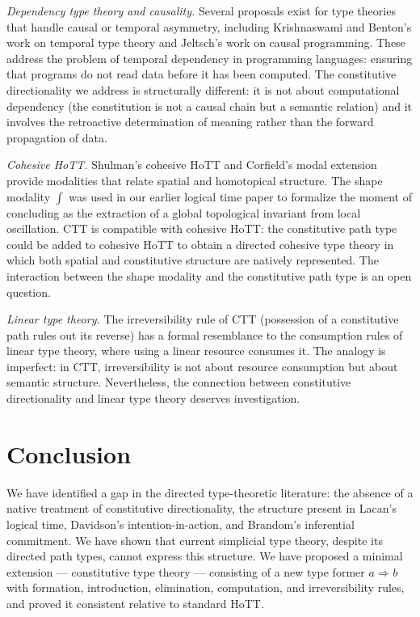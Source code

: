 \documentclass[12pt]{article}
\theoremstyle{definition}
\theoremstyle{remark}
\newcommand{\consthom}[3]{#2 \Rightarrow_{#1} #3}
\begin{document}
\textit{Dependency type theory and causality.} Several proposals exist for type theories that handle causal or temporal asymmetry, including Krishnaswami and Benton's work on temporal type theory and Jeltsch's work on causal programming. These address the problem of temporal dependency in programming languages: ensuring that programs do not read data before it has been computed. The constitutive directionality we address is structurally different: it is not about computational dependency (the constitution is not a causal chain but a semantic relation) and it involves the retroactive determination of meaning rather than the forward propagation of data.

\textit{Cohesive HoTT.} Shulman's cohesive HoTT \cite{shulman2018} and Corfield's modal extension \cite{corfield2020} provide modalities that relate spatial and homotopical structure. The shape modality $\int$ was used in our earlier logical time paper to formalize the moment of concluding as the extraction of a global topological invariant from local oscillation. CTT is compatible with cohesive HoTT: the constitutive path type could be added to cohesive HoTT to obtain a directed cohesive type theory in which both spatial and constitutive structure are natively represented. The interaction between the shape modality and the constitutive path type is an open question.

\textit{Linear type theory.} The irreversibility rule of CTT (possession of a constitutive path rules out its reverse) has a formal resemblance to the consumption rules of linear type theory, where using a linear resource consumes it. The analogy is imperfect: in CTT, irreversibility is not about resource consumption but about semantic structure. Nevertheless, the connection between constitutive directionality and linear type theory deserves investigation.

\section{Conclusion}

We have identified a gap in the directed type-theoretic literature: the absence of a native treatment of constitutive directionality, the structure present in Lacan's logical time, Davidson's intention-in-action, and Brandom's inferential commitment. We have shown that current simplicial type theory, despite its directed path types, cannot express this structure. We have proposed a minimal extension --- constitutive type theory --- consisting of a new type former $\consthom{}{a}{b}$ with formation, introduction, elimination, computation, and irreversibility rules, and proved it consistent relative to standard HoTT.
\end{document}
